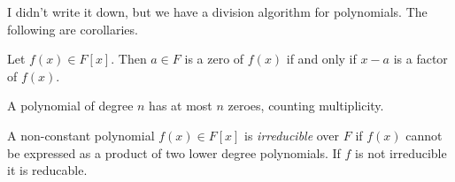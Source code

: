 I didn't write it down, but we have a division algorithm for polynomials. The following are corollaries.
\begin{corollary}\label{cor:1.1}
	Let $f(x)\in F[x]$. Then $a\in F$ is a zero of $f(x)$ if and only if $x-a$ is a factor of $f(x)$.
\end{corollary}
\begin{corollary}\label{cor:1.2}
	A polynomial of degree $n$ has at most $n$ zeroes, counting multiplicity.
\end{corollary}
\begin{definition}[Irreducible]\label{dfn:1.13}
	A non-constant polynomial $f(x)\in F[x]$ is \emph{irreducible} over $F$ if $f(x)$ cannot be expressed as a product of two lower degree polynomials. If $f$ is not irreducible it is reducable.
\end{definition}

